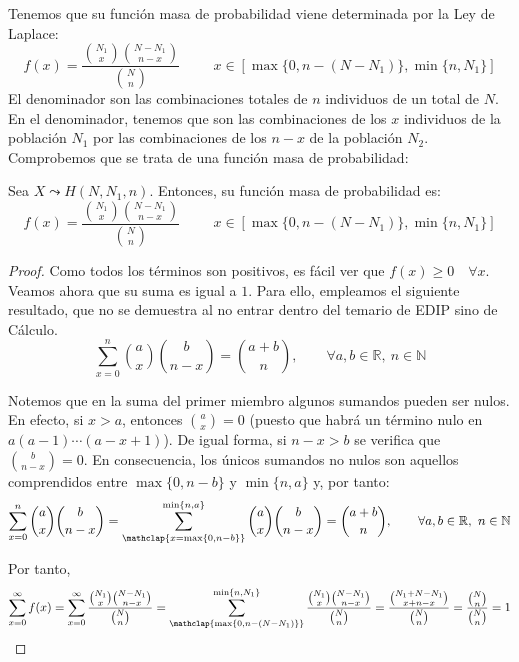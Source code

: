 Tenemos que su función masa de probabilidad viene determinada por la Ley de Laplace:
\begin{equation*}
    f(x) = \frac{\binom{N_1}{x}\binom{N-N_1}{n-x}}{\binom{N}{n}}
    \hspace{1cm}
    x\in \left[\max\{0, n-(N-N_1)\}, \min\{n, N_1\}\right]
\end{equation*}
El denominador son las combinaciones totales de $n$ individuos de un total de $N$. En el denominador, tenemos que son las combinaciones de los $x$ individuos de la población $N_1$ por las combinaciones de los $n-x$ de la población $N_2$.\\

Comprobemos que se trata de una función masa de probabilidad:
\begin{prop}
    Sea $X\leadsto H(N,N_1,n)$. Entonces, su función masa de probabilidad es:
    \begin{equation*}
        f(x) = \frac{\binom{N_1}{x}\binom{N-N_1}{n-x}}{\binom{N}{n}}
        \hspace{1cm}
        x\in \left[\max\{0, n-(N-N_1)\}, \min\{n, N_1\}\right]
    \end{equation*}
\end{prop}
\begin{proof}
    Como todos los términos son positivos, es fácil ver que $f(x)\geq 0\quad \forall x$. Veamos ahora que su suma es igual a $1$. Para ello, empleamos el siguiente resultado, que no se demuestra al no entrar dentro del temario de EDIP sino de Cálculo.
    \begin{equation*}
        \sum_{x=0}^n \binom{a}{x}\binom{b}{n-x} = \binom{a+b}{n}, \qquad \forall a,b\in \mathbb{R},~n\in \mathbb{N}
    \end{equation*}

    Notemos que en la suma del primer miembro algunos sumandos pueden ser nulos. En efecto, si $x > a$, entonces $\binom{a}{x}=0$ (puesto que habrá un término nulo en $a(a-1)\cdots(a-x+1)$). De igual forma, si $n - x > b$ se verifica que $\binom{b}{n-x}=0$. En consecuencia, los únicos sumandos no nulos son aquellos comprendidos entre $\max\{0, n - b\}$ y $\min\{n, a\}$ y, por tanto:
    \begin{equation*}
        \sum_{x=0}^n \binom{a}{x}\binom{b}{n-x}
        = \sum_{\mathclap{x=\max\{0, n - b\}}}^{\min\{n, a\}} \binom{a}{x}\binom{b}{n-x}
        = \binom{a+b}{n}, \qquad \forall a,b\in \mathbb{R},~n\in \mathbb{N}
    \end{equation*}

    Por tanto,
    \begin{equation*}
        \sum_{x=0}^\infty f(x)
        = \sum_{x=0}^\infty \frac{\binom{N_1}{x}\binom{N-N_1}{n-x}}{\binom{N}{n}}
        = \sum_{\mathclap{\max\{0, n-(N-N_1)\}}}^{\min\{n, N_1\}} \frac{\binom{N_1}{x}\binom{N-N_1}{n-x}}{\binom{N}{n}}
        = \frac{\binom{N_1+N-N_1}{x+n-x}}{\binom{N}{n}}
        = \frac{\binom{N}{n}}{\binom{N}{n}} = 1
    \end{equation*}
    
\end{proof}

